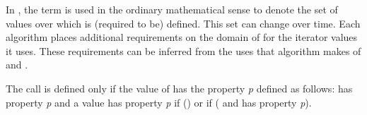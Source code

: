 \pnum
In , the term
is used in the ordinary mathematical sense to denote
the set of values over which
\tcode{==} is (required to be) defined.
This set can change over time.
Each algorithm places additional requirements on the domain of
\tcode{==} for the iterator values it uses.
These requirements can be inferred from the uses that algorithm
makes of \tcode{==} and \tcode{!=}.
\begin{example}
The call 
is defined only if the value of 
has the property \textit{p}
defined as follows:
 has property \textit{p}
and a value 
has property \textit{p}
if
()
or if
(
and
has property
\textit{p}).
\end{example}

